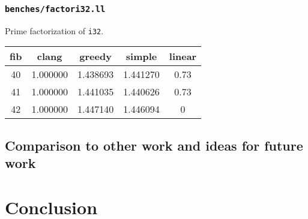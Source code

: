 \documentclass{article}
\begin{document}
\subsubsection{\lstinline!benches/factori32.ll!}
Prime factorization of \lstinline!i32!.
\begin{center}
\begin{tabular}{|c||c|c|c|c|} 
 \hline
 fib & clang & greedy & simple & linear \\ [0.5ex] 
 \hline
 40 & 1.000000 & 1.438693 & 1.441270 & 0.73 \\ [1ex] 
 41 & 1.000000 & 1.441035 & 1.440626 & 0.73 \\ [1ex] 
 42 & 	1.000000 & 1.447140 & 1.446094 & 0\\
 \hline
\end{tabular}
\end{center}

%


 





\subsection{Comparison to other work and ideas for future work}


\section{Conclusion}



\end{document}
